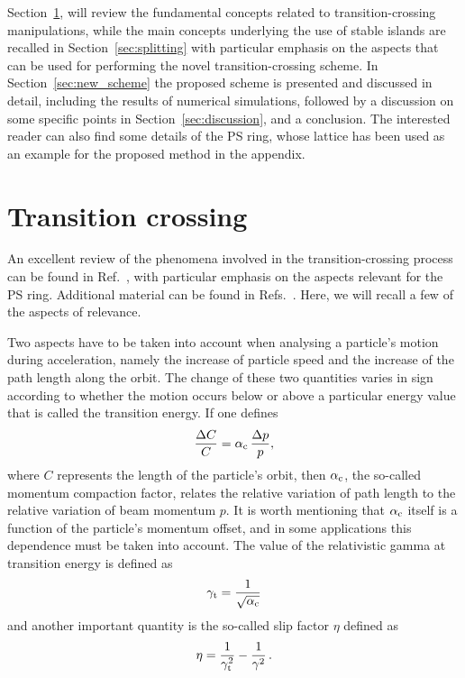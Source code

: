 \documentclass{article}
\begin{document}
Section~\ref{sec:transition}, will review the fundamental concepts related to transition-crossing manipulations, while the main concepts underlying the use of stable islands are recalled in Section~\ref{sec:splitting} with particular emphasis on the aspects that can be used for performing the novel transition-crossing scheme. In Section~\ref{sec:new_scheme} the proposed scheme is presented and discussed in detail, including the results of numerical simulations, followed by a discussion on some specific points in Section~\ref{sec:discussion}, and a conclusion. The interested reader can also find some details of the PS ring, whose lattice has been used as an example for the proposed method in the appendix.
%
\section{Transition crossing}\label{sec:transition}
%
An excellent review of the phenomena involved in the transition-crossing process can be found in Ref.~\cite{PS50V1}, with particular emphasis on the aspects relevant for the PS ring. Additional material can be found in Refs.~\cite{chao,sylee,bryant,ng}. Here, we will recall a few of the aspects of relevance.

Two aspects have to be taken into account when analysing a particle's motion during acceleration, namely the increase of particle speed and the increase of the path length along the orbit. The change of these two quantities varies in sign according to whether the motion occurs below or above a particular energy value that is called the transition energy. If one defines 
%
\begin{equation}
\frac{\Delta C}{C} = \alpha_{\rm c} \, \frac{\Delta p}{p},
\end{equation}
where $C$ represents the length of the particle's orbit, then $\alpha_{\rm c}$, the so-called momentum compaction factor, relates the relative variation of path length to the relative variation of beam momentum $p$. It is worth mentioning that $\alpha_{\rm c}$ itself is a function of the particle's momentum offset, and in some applications this dependence must be taken into account. The value of the relativistic gamma at transition energy is defined as
%
\begin{equation}
\gamma_{\rm t} = \frac{1}{\sqrt{\alpha_{\rm c}}}
\end{equation}
and another important quantity is the so-called slip factor $\eta$ defined as
%
\begin{equation}
\eta = \frac{1}{\gamma_{\rm t}^2} -\frac{1}{\gamma^2} \, .
\end{equation}
%
\end{document}
